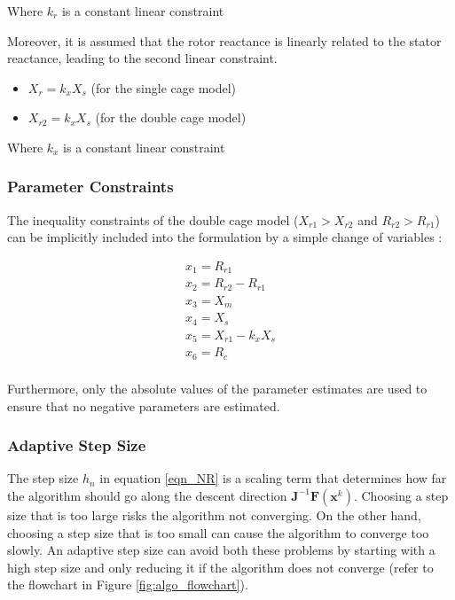 \documentclass{article}
\begin{document}
\noindent Where $k_{r}$ is a constant linear constraint

Moreover, it is assumed that the rotor reactance is linearly related to the stator reactance, leading to the second linear constraint. 

\begin{itemize}
\item $X_{r} = k_{x} X_{s}$ (for the single cage model)
\item $X_{r2} = k_{x} X_{s}$ (for the double cage model)
\end{itemize}

\noindent Where $k_{x}$ is a constant linear constraint

\subsubsection{Parameter Constraints}
\label{sec:constraints}
The inequality constraints of the double cage model ($X_{r1} > X_{r2}$ and $R_{r2} > R_{r1}$) can be implicitly included into the formulation by a simple change of variables \cite{pedra_2004}:

\begin{eqnarray*}
x_{1} = R_{r1} \\
x_{2} = R_{r2} - R_{r1} \\
x_{3} = X_{m} \\
x_{4} = X_{s} \\
x_{5} = X_{r1} - k_{x} X_{s} \\
x_{6} = R_{c} \\
\end{eqnarray*}

Furthermore, only the absolute values of the parameter estimates are used to ensure that no negative parameters are estimated.

\subsubsection{Adaptive Step Size}

The step size $h_{n}$ in equation \ref{eqn_NR} is a scaling term that determines how far the algorithm should go along the descent direction $\mathbf{J}^{-1}  \mathbf{F}( \boldsymbol{x}^{k})$. Choosing a step size that is too large risks the algorithm not converging. On the other hand, choosing a step size that is too small can cause the algorithm to converge too slowly. An adaptive step size can avoid both these problems by starting with a high step size and only reducing it if the algorithm does not converge (refer to the flowchart in Figure \ref{fig:algo_flowchart}).
\end{document}
